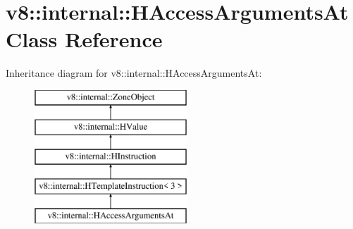 \hypertarget{classv8_1_1internal_1_1_h_access_arguments_at}{}\section{v8\+:\+:internal\+:\+:H\+Access\+Arguments\+At Class Reference}
\label{classv8_1_1internal_1_1_h_access_arguments_at}
Inheritance diagram for v8\+:\+:internal\+:\+:H\+Access\+Arguments\+At\+:\begin{figure}[H]
\begin{center}
\leavevmode
\includegraphics[height=5.000000cm]{classv8_1_1internal_1_1_h_access_arguments_at}
\end{center}
\end{figure}
